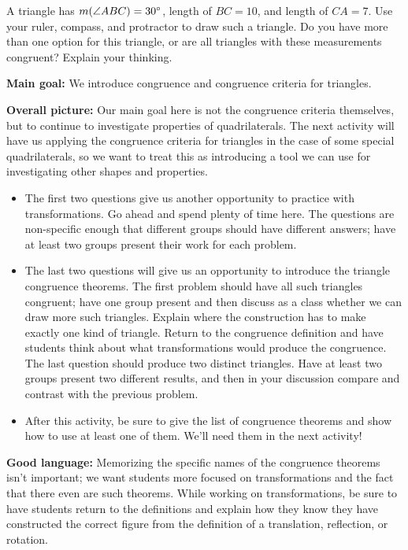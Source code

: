 \documentclass[noauthor, nooutcomes, handout]{ximera}
\begin{document}
\begin{problem}
A triangle has $m(\angle ABC) = 30\degree$, length of $BC = 10$, and length of $CA = 7$. Use your ruler, compass, and protractor to draw such a triangle. Do you have more than one option for this triangle, or are all triangles with these measurements congruent? Explain your thinking.
\end{problem} \vfill


\newpage

\begin{instructorNotes}

{\bf Main goal:} We introduce congruence and congruence criteria for triangles.

{\bf Overall picture:} Our main goal here is not the congruence criteria themselves, but to continue to investigate properties of quadrilaterals. The next activity will have us applying the congruence criteria for triangles in the case of some special quadrilaterals, so we want to treat this as introducing a tool we can use for investigating other shapes and properties.
 
\begin{itemize}
	\item The first two questions give us another opportunity to practice with transformations. Go ahead and spend plenty of time here. The questions are non-specific enough that different groups should have different answers; have at least two groups present their work for each problem.
	\item The last two questions will give us an opportunity to introduce the triangle congruence theorems. The first problem should have all such triangles congruent; have one group present and then discuss as a class whether we can draw more such triangles. Explain where the construction has to make exactly one kind of triangle. Return to the congruence definition and have students think about what transformations would produce the congruence. The last question should produce two distinct triangles. Have at least two groups present two different results, and then in your discussion compare and contrast with the previous problem.
	\item After this activity, be sure to give the list of congruence theorems and show how to use at least one of them. We'll need them in the next activity!
\end{itemize}

{\bf Good language:} Memorizing the specific names of the congruence theorems isn't important; we want students more focused on transformations and the fact that there even are such theorems. While working on transformations, be sure to have students return to the definitions and explain how they know they have constructed the correct figure from the definition of a translation, reflection, or rotation.


\end{instructorNotes}
\end{document}
